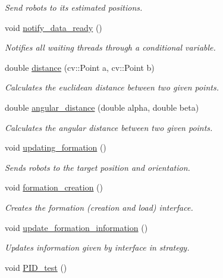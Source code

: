 \begin{DoxyCompactItemize}
\begin{DoxyCompactList}\small\item\em Send robots to its estimated positions. \end{DoxyCompactList}\item 
void \hyperlink{class_cam_cap_ad34d9213700050e66a66e63d027b9bf0}{notify\+\_\+data\+\_\+ready} ()
\begin{DoxyCompactList}\small\item\em Notifies all waiting threads through a conditional variable. \end{DoxyCompactList}\item 
double \hyperlink{class_cam_cap_a6595a726e77091a8accf19e62dc55e41}{distance} (cv\+::\+Point a, cv\+::\+Point b)
\begin{DoxyCompactList}\small\item\em Calculates the euclidean distance between two given points. \end{DoxyCompactList}\item 
double \hyperlink{class_cam_cap_abf57bed0fb3a45bb50947cd6f42698ea}{angular\+\_\+distance} (double alpha, double beta)
\begin{DoxyCompactList}\small\item\em Calculates the angular distance between two given points. \end{DoxyCompactList}\item 
void \hyperlink{class_cam_cap_a8bab2cf2a40f386ab20480cfc83ac77c}{updating\+\_\+formation} ()
\begin{DoxyCompactList}\small\item\em Sends robots to the target position and orientation. \end{DoxyCompactList}\item 
void \hyperlink{class_cam_cap_a848749241df00e03c5fca82cc9423fdd}{formation\+\_\+creation} ()
\begin{DoxyCompactList}\small\item\em Creates the formation (creation and load) interface. \end{DoxyCompactList}\item 
void \hyperlink{class_cam_cap_afa26f0cbaee5db899735934f3548ebe9}{update\+\_\+formation\+\_\+information} ()
\begin{DoxyCompactList}\small\item\em Updates information given by interface in strategy. \end{DoxyCompactList}\item 
void \hyperlink{class_cam_cap_a93f8ee79ed618c215139e40eb0485c9f}{P\+I\+D\+\_\+test} ()

\end{DoxyCompactItemize}
